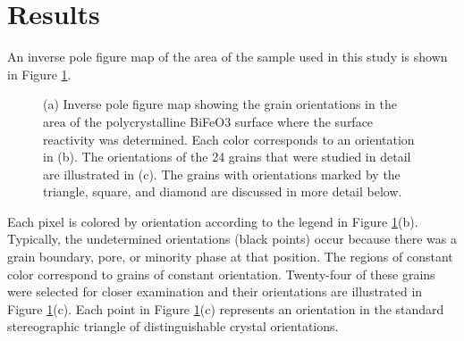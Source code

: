 \documentclass[12pt,%
              twoside,
               letterpaper]{uiothesis}
\begin{document}
\section{Results}
\label{sec:ch7results}


An inverse pole figure map of the area of the sample used in this study is shown in Figure
\ref{fig:bfofig1}.
	\begin{figure}
		\caption[Orientation data for examined BiFeO3 grains]{%
			(a) Inverse pole figure map showing the grain orientations 
			in the area of the polycrystalline BiFeO3 surface where 
			the surface reactivity was determined. Each color corresponds 
			to an orientation in (b). The orientations of the 24 grains 
			that were studied in detail are illustrated in (c). The grains 
			with orientations marked by the triangle, square, and diamond 
			are discussed in more detail below.}
		\label{fig:bfofig1}
\end{figure}
Each pixel is colored by orientation according to the legend in Figure
\ref{fig:bfofig1}(b). Typically, the undetermined orientations (black points) occur
because there was a grain boundary, pore, or minority phase at that position. The regions
of constant color correspond to grains of constant orientation. Twenty-four of these
grains were selected for closer examination and their orientations are illustrated in
Figure \ref{fig:bfofig1}(c). Each point in Figure \ref{fig:bfofig1}(c) represents an
orientation in the standard stereographic triangle of distinguishable crystal
orientations.
\end{document}
